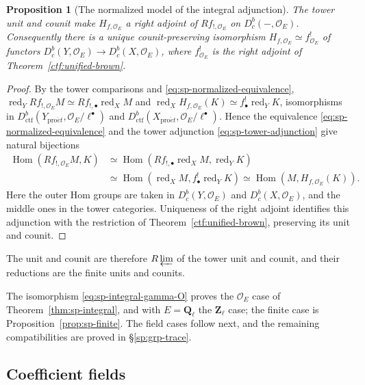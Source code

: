 \documentclass[11pt,a4paper]{article}
\numberwithin{equation}{section}
\newtheorem{proposition}[theorem]{Proposition}
\theoremstyle{definition}
\theoremstyle{remark}
\newcommand{\Dbc}{D^b_c}
\newcommand{\Ql}{\mathbf Q_\ell}
\newcommand{\Zl}{\mathbf Z_\ell}
\newcommand{\proet}{\mathrm{pro}\acute{e}t}
\newcommand{\Dctf}{D^b_{\mathrm{ctf}}}
\begin{document}
\begin{proposition}[The normalized model of the integral adjunction]
\label{prop:sp-integral-adjunction}
The tower unit and counit make $H_{f,\mathcal O_E}$ a right adjoint
of $Rf_{!,\mathcal O_E}$ on $\Dbc(-,\mathcal O_E)$. Consequently there is a
unique counit-preserving isomorphism
$H_{f,\mathcal O_E}\simeq f_{\mathcal O_E}^!$ of functors
$\Dbc(Y,\mathcal O_E)\to\Dbc(X,\mathcal O_E)$, where $f_{\mathcal O_E}^!$
is the right adjoint of Theorem~\ref{ctf:unified-brown}.
\end{proposition}
\begin{proof}
By the tower comparisons and \eqref{eq:sp-normalized-equivalence},
$\operatorname{red}_Y Rf_{!,\mathcal O_E}M\simeq Rf_{!,\bullet}\operatorname{red}_X M$
and $\operatorname{red}_X H_{f,\mathcal O_E}(K)\simeq f_\bullet^!\operatorname{red}_Y K$,
isomorphisms in $\Dctf(Y_{\proet},\mathcal O_E/\ell^\bullet)$ and
$\Dctf(X_{\proet},\mathcal O_E/\ell^\bullet)$.
Hence the equivalence \eqref{eq:sp-normalized-equivalence} and the tower
adjunction \eqref{eq:sp-tower-adjunction} give natural bijections
\[
 \begin{aligned}
 \operatorname{Hom}(Rf_{!,\mathcal O_E}M,K)
 &\simeq\operatorname{Hom}(Rf_{!,\bullet}\operatorname{red}_X M,\operatorname{red}_Y K)\\
 &\simeq\operatorname{Hom}(\operatorname{red}_X M,f_\bullet^!\operatorname{red}_Y K)
 \simeq\operatorname{Hom}(M,H_{f,\mathcal O_E}(K)).
 \end{aligned}
\]
Here the outer Hom groups are taken in $\Dbc(Y,\mathcal O_E)$ and
$\Dbc(X,\mathcal O_E)$, and the middle ones in the tower categories.
Uniqueness of the right adjoint identifies this adjunction with the
restriction of Theorem~\ref{ctf:unified-brown}, preserving its unit and
counit.
\end{proof}

The unit and counit are therefore $R\varprojlim$ of the tower unit and
counit, and their reductions are the finite units and counits.

The isomorphism \eqref{eq:sp-integral-gamma-O} proves the
$\mathcal O_E$ case of Theorem~\ref{thm:sp-integral}, and with $E=\Ql$
the $\Zl$ case; the finite case is Proposition~\ref{prop:sp-finite}. The field cases
follow next, and the remaining compatibilities are proved in
\S\ref{sp:grp-trace}.

\subsection{Coefficient fields}
\label{sp:grp-fields}
\end{document}

